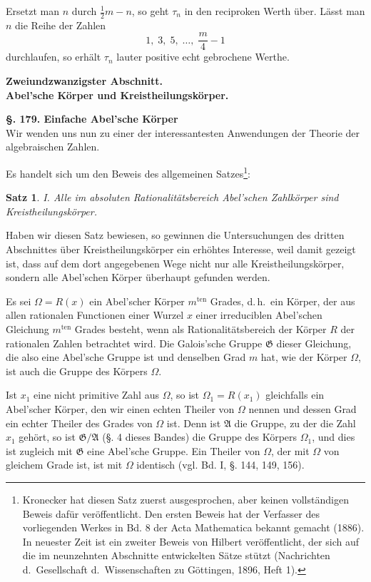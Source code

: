 \documentclass[12pt,a4paper]{article}
\newtheorem*{satz}{Satz}
\begin{document}
Ersetzt man $n$ durch $\frac{1}{2}m - n$, so geht $\tau_n$ in den reciproken Werth über. Lässt man $n$ die Reihe der Zahlen
\[
1,\; 3,\; 5,\; \ldots,\; \frac{m}{4} - 1
\]
durchlaufen, so erhält $\tau_n$ lauter positive echt gebrochene Werthe.

\bigskip
\begin{center}
\textbf{Zweiundzwanzigster Abschnitt.}\\[4pt]
\textbf{Abel'sche Körper und Kreistheilungskörper.}
\end{center}
\bigskip

\noindent\textbf{\S. 179. Einfache Abel'sche Körper}\\[4pt]

Wir wenden uns nun zu einer der interessantesten Anwendungen der Theorie der algebraischen Zahlen.

Es handelt sich um den Beweis des allgemeinen Satzes\footnote{Kronecker hat diesen Satz zuerst ausgesprochen, aber keinen vollständigen Beweis dafür veröffentlicht. Den ersten Beweis hat der Verfasser des vorliegenden Werkes in Bd. 8 der Acta Mathematica bekannt gemacht (1886). In neuester Zeit ist ein zweiter Beweis von Hilbert veröffentlicht, der sich auf die im neunzehnten Abschnitte entwickelten Sätze stützt (Nachrichten d.\ Gesellschaft d.\ Wissenschaften zu Göttingen, 1896, Heft 1).}:

\begin{satz}
I. Alle im absoluten Rationalitätsbereich Abel'schen Zahlkörper sind Kreistheilungskörper.
\end{satz}

Haben wir diesen Satz bewiesen, so gewinnen die Untersuchungen des dritten Abschnittes über Kreistheilungskörper ein erhöhtes Interesse, weil damit gezeigt ist, dass auf dem dort angegebenen Wege nicht nur alle Kreistheilungskörper, sondern alle Abel'schen Körper überhaupt gefunden werden.

Es sei $\Omega = R(x)$ ein Abel'scher Körper $m^{\text{ten}}$ Grades, d.\,h.\ ein Körper, der aus allen rationalen Functionen einer Wurzel $x$ einer irreduciblen Abel'schen Gleichung $m^{\text{ten}}$ Grades besteht, wenn als Rationalitätsbereich der Körper $R$ der rationalen Zahlen betrachtet wird. Die Galois'sche Gruppe $\mathfrak{G}$ dieser Gleichung, die also eine Abel'sche Gruppe ist und denselben Grad $m$ hat, wie der Körper $\Omega$, ist auch die Gruppe des Körpers $\Omega$.

Ist $x_1$ eine nicht primitive Zahl aus $\Omega$, so ist $\Omega_1 = R(x_1)$ gleichfalls ein Abel'scher Körper, den wir einen echten Theiler von $\Omega$ nennen und dessen Grad ein echter Theiler des Grades von $\Omega$ ist. Denn ist $\mathfrak{A}$ die Gruppe, zu der die Zahl $x_1$ gehört, so ist $\mathfrak{G}/\mathfrak{A}$ (\S. 4 dieses Bandes) die Gruppe des Körpers $\Omega_1$, und dies ist zugleich mit $\mathfrak{G}$ eine Abel'sche Gruppe. Ein Theiler von $\Omega$, der mit $\Omega$ von gleichem Grade ist, ist mit $\Omega$ identisch (vgl. Bd. I, \S. 144, 149, 156).
\end{document}
